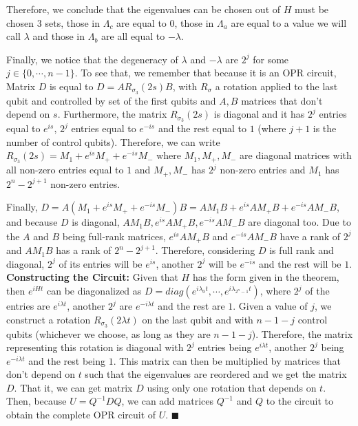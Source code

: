 Therefore, we conclude that the eigenvalues can be chosen out of $H$ must be chosen 3 sets, 
those in $\Lambda_c$ are equal to $0$, those in $\Lambda_a$ are equal to a value we
will call $\lambda$ and those in $\Lambda_b$ are all equal to $-\lambda$. 

Finally, we notice that the degeneracy of $\lambda$ and
$-\lambda$ are $2^j$ for some $j \in \{0, \cdots, n-1\}$.
 To see that, we remember that because it is an OPR circuit, 
Matrix $D$ is equal to $D = A R_{\sigma_3} (2s)B$, 
with $R_{\sigma}$ a rotation applied to the last qubit and controlled by set of the first qubits and $A,B$ 
matrices that don't depend on $s$.
Furthermore, the matrix $R_{\sigma_3}(2s)$ is diagonal and
it has $2^j$ entries equal to $e^{is}$, $2^j$ entries equal to $e^{-is}$ and the rest equal to $1$ 
(where $j+1$ is the number of  control qubits). 
Therefore, we can write $R_{\sigma_3}(2s) = M_1 + e^{is} M_+ + e^{-is} M_-$
 where $M_1, M_+, M_-$ are diagonal matrices with all non-zero entries equal to $1$ and 
$M_+, M_-$ has $2^j$ non-zero entries and $M_1$ has $2^n - 2^{j+1}$ non-zero entries.

Finally, $D = A(M_1 + e^{is} M_+ + e^{-is} M_-) B = AM_1 B + e^{is} AM_+ B + e^{-is} AM_- B$,
and because $D$ is diagonal, $AM_1B , e^{is} AM_+B, e^{-is} AM_- B$ are
diagonal too. Due to the $A$ and $B$ being full-rank matrices, $e^{is} AM_+B$ 
and $e^{-is} AM_-B$ have a rank of $2^j$ and $AM_1B$ has a rank of $2^n- 2^{j+1}$. 
Therefore, considering $D$ is full rank and diagonal, 
$2^j$ of its entries will be $e^{is}$, another $2^j$ will be $e^{-is}$
and the rest will be $1$. \\

\textbf{Constructing the 
Circuit:}  Given that $H$ has the form given in the theorem,
then $e^{iHt}$ can be diagonalized as $D = diag(e^{i\lambda_0 t}, \cdots , e^{i\lambda_{2^n-1}t})$,
where $2^j$ of the entries are $e^{i\lambda t}$, another $2^j$ are $e^{-i\lambda t}$ 
and the rest are $1$. 
Given a value of $j$, we construct a rotation $R_{\sigma_3}(2\lambda t)$ on the last qubit and with $n-1-j$ control qubits 
(whichever we choose, as long as they are $n-1-j$).
Therefore, the matrix representing this rotation is diagonal with $2^j$
entries being $e^{i\lambda t}$, another $2^j$ being $e^{-i\lambda t}$ and the rest being $1$.
This matrix can then be multiplied by matrices that don't depend on $t$
such that the eigenvalues are reordered and we get the matrix $D$.
That it, we can get matrix $D$ using only one rotation that depends on $t$. 
Then, because $U = Q^{-1} D Q$, we can add matrices $Q^{-1}$ and $Q$ to the circuit
to obtain the complete OPR circuit of $U$. $\blacksquare$ \\ 

